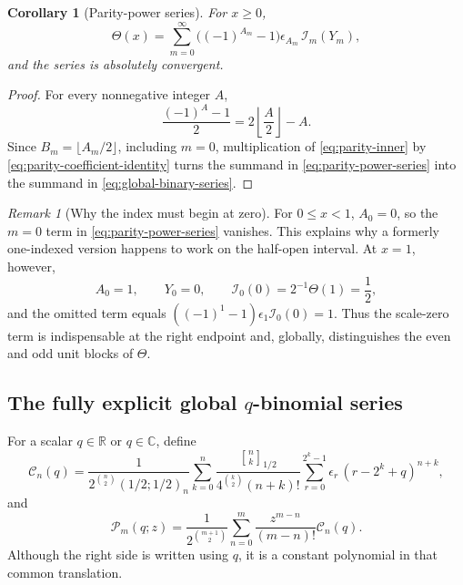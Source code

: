 \documentclass[11pt]{article}
\numberwithin{equation}{section}
\newtheorem{corollary}[theorem]{Corollary}
\theoremstyle{definition}
\theoremstyle{remark}
\newtheorem{remark}[theorem]{Remark}
\newcommand{\R}{\mathbb{R}}
\newcommand{\C}{\mathbb{C}}
\newcommand{\Th}{\Theta}
\newcommand{\qbinom}[2]{\genfrac{[}{]}{0pt}{}{#1}{#2}_{1/2}}
\begin{document}
\begin{corollary}[Parity-power series]
\label{cor:parity-power-series}
For $x\geq0$,
\begin{equation}\label{eq:parity-power-series}
 \Th(x)=\sum_{m=0}^{\infty}
 \bigl((-1)^{A_m}-1\bigr)\epsilon_{A_m}\,\mathcal I_m(Y_m),
\end{equation}
and the series is absolutely convergent.
\end{corollary}

\begin{proof}
For every nonnegative integer $A$,
\begin{equation}\label{eq:parity-coefficient-identity}
 \frac{(-1)^A-1}{2}=2\left\lfloor\frac A2\right\rfloor-A.
\end{equation}
Since $B_m=\lfloor A_m/2\rfloor$, including $m=0$, multiplication of
\eqref{eq:parity-inner} by \eqref{eq:parity-coefficient-identity} turns the
summand in \eqref{eq:parity-power-series} into the summand in
\eqref{eq:global-binary-series}.
\end{proof}

\begin{remark}[Why the index must begin at zero]
For $0\leq x<1$, $A_0=0$, so the $m=0$ term in
\eqref{eq:parity-power-series} vanishes.  This explains why a formerly
one-indexed version happens to work on the half-open interval.  At $x=1$,
however,
\[
 A_0=1,\qquad Y_0=0,\qquad
 \mathcal I_0(0)=2^{-1}\Th(1)=\frac12,
\]
and the omitted term equals
$((-1)^1-1)\epsilon_1\mathcal I_0(0)=1$.  Thus the scale-zero term is
indispensable at the right endpoint and, globally, distinguishes the even and
odd unit blocks of $\Th$.
\end{remark}

\subsection{The fully explicit global \texorpdfstring{$q$}{q}-binomial series}

For a scalar $q\in\R$ or $q\in\C$, define
\begin{equation}\label{eq:q-global-Cn}
 \mathcal C_n(q)=
 \frac{1}{2^{\binom n2}(1/2;1/2)_n}
 \sum_{k=0}^{n}
 \frac{\qbinom{n}{k}}{4^{\binom k2}(n+k)!}
 \sum_{r=0}^{2^k-1}
 \epsilon_r\,(r-2^k+q)^{n+k},
\end{equation}
and
\begin{equation}\label{eq:q-global-polynomial}
 \mathcal P_m(q;z)=
 \frac{1}{2^{\binom{m+1}{2}}}
 \sum_{n=0}^{m}\frac{z^{m-n}}{(m-n)!}\mathcal C_n(q).
\end{equation}
Although the right side is written using $q$, it is a constant polynomial in
that common translation.
\end{document}
